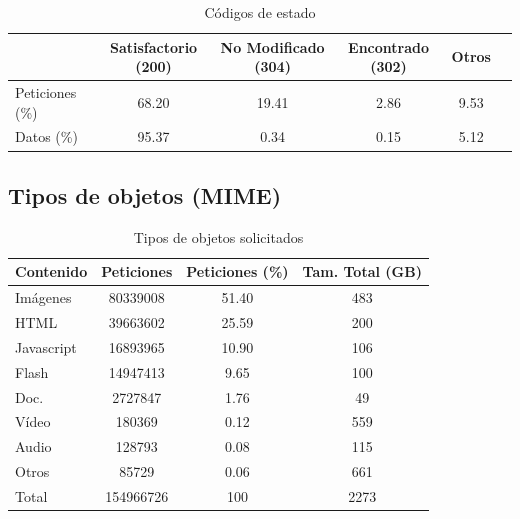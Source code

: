 \documentclass[twocolumn]{Jornadas}
\begin{document}
\begin{table}
\centering
\renewcommand{\baselinestretch}{1.5}
\scriptsize
\begin{tabular}{|l||c|c|c|c|c|} \hline
  & Satisfactorio (200) & No Modificado (304) & Encontrado (302) & Otros\\\hline\hline
Peticiones (\%)    & 68.20  & 19.41 & 2.86 & 9.53            \\\hline  
Datos (\%)        & 95.37   & 0.34 & 0.15 & 5.12             \\\hline 
\end{tabular}
\caption{Códigos de estado}
\label{table:codigos}
\end{table}


\subsection{Tipos de objetos (MIME)}
\label{mime}

\begin{table}
\centering
\renewcommand{\baselinestretch}{1.5}
\scriptsize
\begin{tabular}{|l||c|c|c|} \hline
Contenido   & Peticiones & Peticiones (\%) &Tam. Total (GB) \\\hline\hline
Imágenes    & 80339008   & 51.40 &483             \\\hline  
HTML        & 39663602   & 25.59 &200             \\\hline 
Javascript  & 16893965   & 10.90 &106             \\\hline 
Flash       & 14947413   & 9.65 & 100              \\\hline 
Doc.       & 2727847    & 1.76 &49              \\\hline
Vídeo       & 180369     & 0.12 & 559             \\\hline 
Audio       & 128793     & 0.08 & 115             \\\hline 
Otros       & 85729      & 0.06 & 661             \\\hline\hline
Total & 154966726 & 100 & 2273 \\\hline
\end{tabular}
\caption{Tipos de objetos solicitados}
\label{table:contenido}
\end{table}
\end{document}
